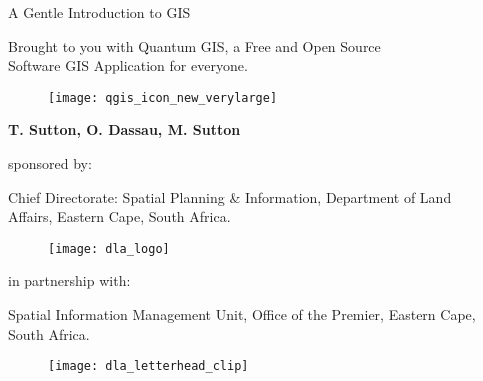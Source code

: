 
\begin{titlepage}
\begin{center}

{\Huge A Gentle Introduction to GIS}\\

\vspace{0.5cm}

\Large{Brought to you with Quantum GIS, a Free and Open Source \\
Software GIS Application for everyone.

\begin{figure}[H]
\begin{center}
\texttt{[image: qgis\_icon\_new\_verylarge]} 
\end{center}
\end{figure}

\textbf{T. Sutton, O. Dassau, M. Sutton}\\

\vspace{1cm}

sponsored by:

Chief Directorate: Spatial Planning \& Information, Department of Land \\
Affairs, Eastern Cape, South Africa.

\begin{figure}[H]
\begin{center}
\texttt{[image: dla\_logo]}
\end{center}
\end{figure}

in partnership with:

Spatial Information Management Unit, Office of the Premier, Eastern Cape, \\
South Africa.}

\begin{figure}[H]
\begin{center}
\texttt{[image: dla\_letterhead\_clip]}
\end{center}
\end{figure}

\end{center}
\end{titlepage}


